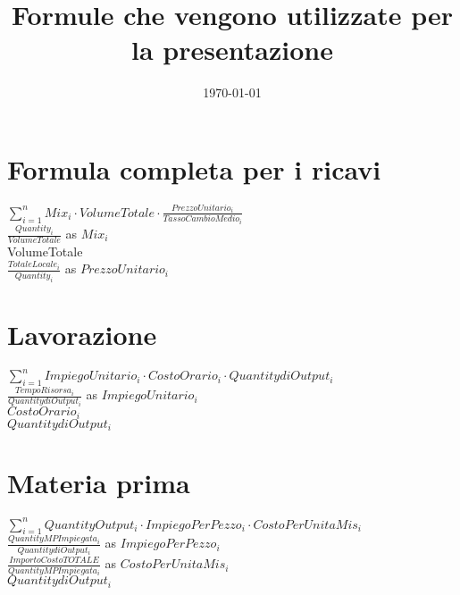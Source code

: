 \documentclass[14pt]{extarticle}
\title{Formule che vengono utilizzate per la presentazione}
\date{\today}
\begin{document}
\maketitle
\section{Formula completa per i ricavi}
$\sum_{i=1} ^{n} Mix_{i}\cdot VolumeTotale \cdot $$\frac{PrezzoUnitario_{i}}{TassoCambioMedio_{i}}$
\bigskip
\\$\frac{Quantity_{i}}{VolumeTotale}$ as $Mix_{i}$
\bigskip
\\VolumeTotale
\bigskip
\\$\frac{TotaleLocale_{i}}{Quantity_{i}}$ as $PrezzoUnitario_{i}$

\section{Lavorazione}
$\sum_{i=1} ^{n} ImpiegoUnitario_i \cdot CostoOrario_i \cdot QuantitydiOutput_i$
\bigskip
\\$\frac{TempoRisorsa_{i}}{QuantitydiOutput_{i}}$ as $ImpiegoUnitario_{i}$
\bigskip
\bigskip
\\$CostoOrario_{i}$
\bigskip
\bigskip
\\$QuantitydiOutput_{i}$

\section{Materia prima}
$\sum_{i=1} ^{n}QuantityOutput_i \cdot ImpiegoPerPezzo_i\cdot CostoPerUnitaMis_i$
\bigskip
\\$\frac{QuantityMPImpiegata_{i}}{QuantitydiOutput_{i}}$ as $ImpiegoPerPezzo_{i}$
\bigskip
\bigskip
\\$\frac {ImportoCostoTOTALE}{QuantityMPImpiegata_{i}}$ as $CostoPerUnitaMis_{i}$
\bigskip
\bigskip
\\$QuantitydiOutput_{i}$
\end{document}

